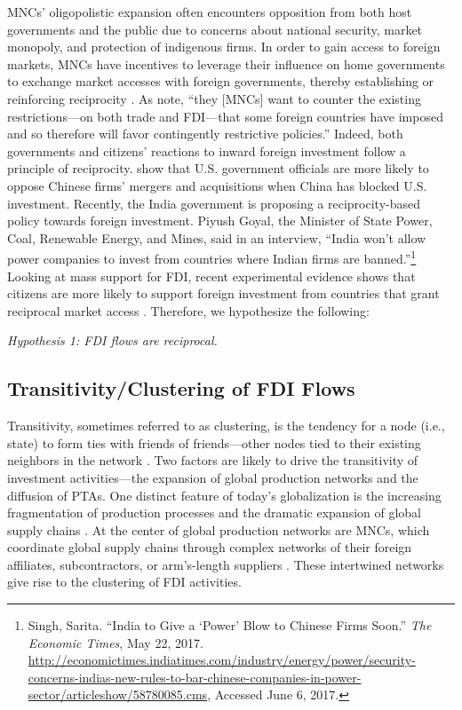 \documentclass[reqno,onecolumn,letterpaper,12pt]{article}
\begin{document}
MNCs' oligopolistic expansion often encounters opposition from both host governments and the public due to concerns about national security, market monopoly, and protection of indigenous firms. In order to gain access to foreign markets, MNCs have incentives to leverage their influence on home governments to exchange market accesses with foreign governments, thereby establishing or reinforcing reciprocity \citep{Milner:1988,Crystal:2003}. As \citet[6]{Crystal:2003} note, ``they [MNCs] want to counter the existing restrictions---on both trade and FDI---that some foreign countries have imposed and so therefore will favor contingently restrictive policies.'' Indeed, both governments and citizens' reactions to inward foreign investment follow a principle of reciprocity. \citet{Tingley:2015} show that U.S. government officials are more likely to oppose Chinese firms' mergers and acquisitions when China has blocked U.S. investment. Recently, the India government is proposing a reciprocity-based policy towards foreign investment. Piyush Goyal, the Minister of State Power, Coal, Renewable Energy, and Mines, said in an interview, ``India won't allow power companies to invest from countries where Indian firms are banned.''\footnote{Singh, Sarita. ``India to Give a `Power' Blow to Chinese Firms Soon.'' \textit{The Economic Times}, May 22, 2017. \url{http://economictimes.indiatimes.com/industry/energy/power/security-concerns-indias-new-rules-to-bar-chinese-companies-in-power-sector/articleshow/58780085.cms}, Accessed June 6, 2017.} Looking at mass support for FDI, recent experimental evidence shows that citizens are more likely to support foreign investment from countries that grant reciprocal market access \citep{Chilton_et_al:forthcoming}. Therefore, we hypothesize the following:



\begin{center}
\textit{Hypothesis 1: FDI flows are reciprocal.}
\end{center}


\subsection{Transitivity/Clustering of FDI Flows}
Transitivity, sometimes referred to as clustering, is the tendency for a node (i.e., state) to form ties with friends of friends---other nodes tied to their existing neighbors in the network \citep{holland1971transitivity}. Two factors are likely to drive the transitivity of investment activities---the expansion of global production networks and the diffusion of PTAs.  One distinct feature of today's globalization is the increasing fragmentation of production processes and the dramatic expansion of global supply chains \citep{UNCTAD:2013}. At the center of global production networks are MNCs, which coordinate global supply chains through complex networks of their foreign affiliates, subcontractors, or arm's-length suppliers \citep[xxii]{UNCTAD:2013}. These intertwined networks give rise to the clustering of FDI activities.
\end{document}
